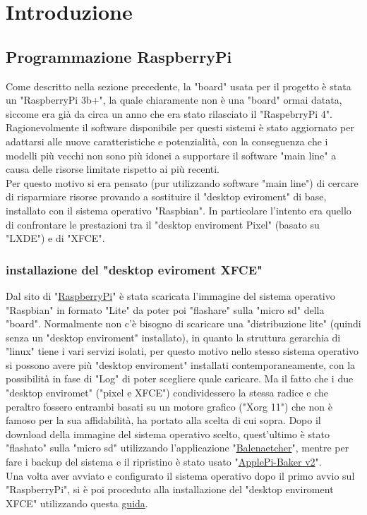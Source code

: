 \chapter{Introduzione}\label{cap:Programmazione del supporto hardware del progetto}

\section{Programmazione RaspberryPi}\label{sez:Programmazione RaspberryPi}

Come descritto nella sezione precedente, la "board" usata per il progetto è stata un "RaspberryPi 3b+", la quale chiaramente non è una "board" ormai datata, siccome era già da circa un anno che era stato rilasciato il "RaspebrryPi 4". Ragionevolmente il software disponibile per questi sistemi è stato aggiornato per adattarsi alle nuove caratteristiche e potenzialità, con la conseguenza che i modelli più vecchi non sono più idonei a supportare il software "main line" a causa delle risorse limitate rispetto ai più recenti.\\
Per questo motivo si era pensato (pur utilizzando software "main line") di cercare di risparmiare risorse provando a sostituire il "desktop eviroment" di base, installato con il sistema operativo "Raspbian". In particolare l'intento era quello di confrontare le prestazioni tra il "desktop enviroment Pixel" (basato su "LXDE") e di "XFCE".  

\subsection{installazione del "desktop eviroment XFCE"}
Dal sito di "\href{https://www.raspberrypi.com/software/operating-systems/}{RaspberryPi}" è stata scaricata l'immagine del sistema operativo "Raspbian" in formato "Lite" da poter poi "flashare" sulla "micro sd" della "board".  Normalmente non c'è bisogno di scaricare una "distribuzione lite" (quindi senza un "desktop enviroment" installato), in quanto la struttura gerarchia di "linux" tiene i vari servizi isolati, per questo motivo nello stesso sistema operativo si possono avere più "desktop enviroment" installati contemporaneamente, con la possibilità in fase di "Log" di poter scegliere quale caricare. Ma il fatto che i due "desktop enviromet" ("pixel e XFCE") condividessero la stessa radice e che peraltro fossero entrambi basati su un motore grafico ("Xorg 11") che non è famoso per la sua affidabilità, ha portato alla scelta di cui sopra. 
Dopo il download della immagine del sistema operativo scelto, quest'ultimo è stato "flashato" sulla "micro sd" utilizzando l'applicazione "\href{https://etcher.balena.io/}{Balenaetcher}", mentre per fare i backup del sistema e il ripristino è stato usato "\href{https://www.tweaking4all.com/software/macosx-software/applepi-baker-v2/}{ApplePi-Baker v2}". \\
Una volta aver avviato e configurato il sistema operativo dopo il primo avvio sul "RaspberryPi", si è poi proceduto alla installazione del "desktop enviroment XFCE" utilizzando questa \href{https://www.makeuseof.com/desktop-environments-you-can-run-on-a-raspberry-pi/}{guida}.\\
